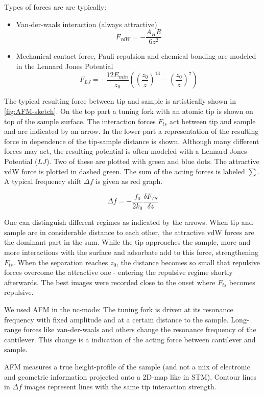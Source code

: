 Types of forces are are typically:
\begin{itemize}
 \item Van-der-waals interaction (always attractive)
 $$ F_{vdW} = - \frac{A_HR}{6z^2}$$
 \item Mechanical contact force, Pauli repulsion and chemical bonding are modeled in the Lennard Jones Potential
$$ F_{LJ} = - \frac{12 E_{min}}{z_0} \left ( \left (\frac{z_0}{z} \right ) ^{13} - \left ( \frac{z_0}{z} \right )^7 \right ) $$
\end{itemize}

The typical resulting force between tip and sample is artistically shown in \autoref{fig:AFM-sketch}. On the top part a tuning fork with an atomic tip is shown on top of the sample surface. The interaction forces $F_{ts}$ act between tip and sample and are indicated by an arrow. In the lower part a representation of the resulting force in dependence of the tip-sample distance is shown. Although many different forces may act, the resulting potential is often modeled with a Lennard-Jones-Potential ($LJ$)\cite{jones_determination_1924}. Two of these are plotted with green and blue dots. The attractive vdW force is plotted in dashed green. The sum of the acting forces is labeled $\sum$. A typical frequency shift $\Delta f$ is given as red graph. 

$$\Delta f = - \frac{f_0}{2k_0}\frac{\delta F_{TS}}{\delta z}$$

One can distinguish different regimes as indicated by the arrows. When tip and sample are in considerable distance to each other, the attractive vdW forces are the dominant part in the sum. While the tip approaches the sample, more and more interactions with the surface and adsorbate add to this force, strengthening $F_{ts}$. When the separation reaches $z_0$, the distance becomes so small that repulsive forces overcome the attractive one - entering the repulsive regime shortly afterwards. The best images were recorded close to the onset where $F_{ts}$ becomes repulsive.

We used AFM in the nc-mode: The tuning fork is driven at its resonance frequency with fixed amplitude and at a certain distance to the sample. Long-range forces like van-der-waals and others change the resonance frequency of the cantilever. This change is a indication of the acting force between cantilever and sample. 

AFM measures a true height-profile of the sample (and not a mix of electronic and geometric information projected onto a 2D-map like in STM). Contour lines in $\Delta f$ images represent lines with the same tip interaction strength.

